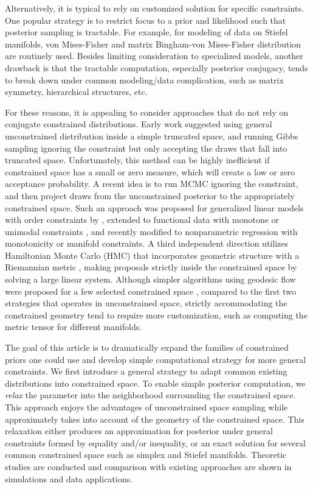 \documentclass[10pt,fleqn]{article} \pdfoutput=1
\DeclareMathOperator{\1}{\mathbbm{1}} \DeclareMathOperator{\bigO}{\mc O}
\begin{document}
Alternatively, it is typical to rely on customized solution for specific
constraints. One popular strategy is to restrict focus to a prior and
likelihood such that posterior sampling is tractable. For example, for
modeling of data on Stiefel manifolds, von Mises-Fisher and matrix
Bingham-von Mises-Fisher distribution
\citep{khatri1977mises,hoff2009simulation} are routinely used. Besides
limiting consideration to specialized models, another  drawback is that the
tractable computation, especially posterior conjugacy, tends to break down
under common modeling/data complication, such as matrix symmetry,
hierarchical structures, etc.

For these reasons, it is appealing to consider approaches that do not rely
on conjugate constrained distributions. Early work
\citep{gelfand1992bayesian} suggested using general unconstrained
distribution inside a simple truncated space, and running Gibbs sampling
ignoring the constraint but only accepting the draws that fall into
truncated space. Unfortunately, this method can be highly inefficient if
constrained space has a small or zero measure, which will create a low or
zero  acceptance probability. A recent  idea is to run MCMC ignoring the
constraint, and then project draws from the unconstrained posterior to the
appropriately constrained space. Such an approach was proposed for
generalized linear models with order constraints by
\cite{dunson2003bayesian}, extended to functional data with monotone or
unimodal constraints \citep{gunn2005transformation}, and recently modified
to nonparametric regression with monotonicity \citep{lin2014monogp} or
manifold \citep{lin2016extrinsic} constraints. A third independent
direction utilizes Hamiltonian Monte Carlo (HMC) that incorporates
geometric structure with a Riemannian metric \citep{girolami2011riemann},
making proposals strictly inside the constrained space by solving a large
linear system. Although simpler algorithms using  geodesic flow were
proposed for a few selected constrained space \citep{byrne2013geodesic},
compared to the first two strategies that operates in unconstrained space,
strictly accommodating the constrained geometry tend to require more
customization, such as computing the metric tensor for different manifolds.


The goal of this article is to dramatically expand the families of
constrained priors one could use and develop simple computational strategy
for more general constraints. We first introduce a general strategy to
adapt common existing distributions into constrained space. To enable
simple posterior computation, we {\em relax} the parameter into the
neighborhood surrounding the constrained space. This approach enjoys the
advantages of unconstrained space sampling while approximately takes into
account of the geometry of the constrained space. This relaxation either
produces an approximation for posterior under general constraints formed by
equality and/or inequality, or an exact solution for several common
constrained space such as simplex and Stiefel manifolds. Theoretic studies
are conducted and comparison with existing approaches  are shown in
simulations and data applications.
\end{document}
